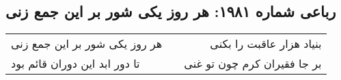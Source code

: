 \begin{center}
\section*{رباعی شماره ۱۹۸۱: هر روز یکی شور بر این جمع زنی}
\label{sec:1981}
\begin{longtable}{l p{0.5cm} r}
هر روز یکی شور بر این جمع زنی
&&
بنیاد هزار عاقبت را بکنی
\\
تا دور ابد این دوران قائم بود
&&
بر جا فقیران کرم چون تو غنی
\\
\end{longtable}
\end{center}
